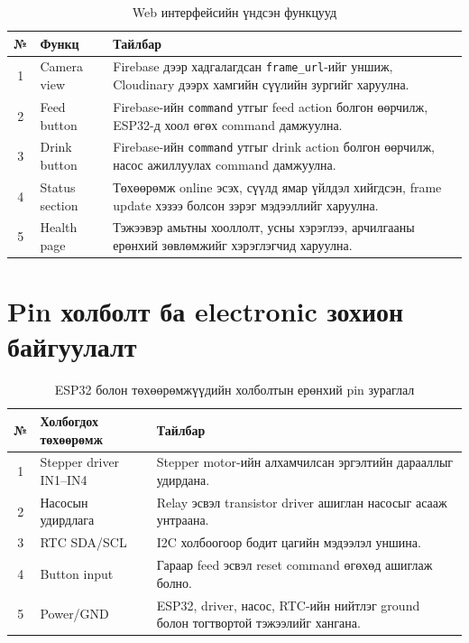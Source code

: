 \documentclass[12pt,a4paper]{report}
\begin{document}
\begin{table}[H]
\scriptsize
\centering
\caption{Web интерфейсийн үндсэн функцууд}
\begin{tabularx}{\textwidth}{|c|X|X|}
\hline
\textbf{№} & \textbf{Функц} & \textbf{Тайлбар} \\ \hline
1 & Camera view & Firebase дээр хадгалагдсан \texttt{frame\_url}-ийг уншиж, Cloudinary дээрх хамгийн сүүлийн зургийг харуулна. \\ \hline
2 & Feed button & Firebase-ийн \texttt{command} утгыг feed action болгон өөрчилж, ESP32-д хоол өгөх command дамжуулна. \\ \hline
3 & Drink button & Firebase-ийн \texttt{command} утгыг drink action болгон өөрчилж, насос ажиллуулах command дамжуулна. \\ \hline
4 & Status section & Төхөөрөмж online эсэх, сүүлд ямар үйлдэл хийгдсэн, frame update хэзээ болсон зэрэг мэдээллийг харуулна. \\ \hline
5 & Health page & Тэжээвэр амьтны хооллолт, усны хэрэглээ, арчилгааны ерөнхий зөвлөмжийг хэрэглэгчид харуулна. \\ \hline
\end{tabularx}
\end{table}

\section{Pin холболт ба electronic зохион байгуулалт}

\begin{table}[H]
\centering
\scriptsize
\caption{ESP32 болон төхөөрөмжүүдийн холболтын ерөнхий pin зураглал}
\begin{tabularx}{\textwidth}{|c|X|X|}
\hline
\textbf{№} & \textbf{Холбогдох төхөөрөмж} & \textbf{Тайлбар} \\ \hline
1 & Stepper driver IN1--IN4 & Stepper motor-ийн алхамчилсан эргэлтийн дарааллыг удирдана. \\ \hline
2 & Насосын удирдлага & Relay эсвэл transistor driver ашиглан насосыг асааж унтраана. \\ \hline
3 & RTC SDA/SCL & I2C холбоогоор бодит цагийн мэдээлэл уншина. \\ \hline
4 & Button input & Гараар feed эсвэл reset command өгөхөд ашиглаж болно. \\ \hline
5 & Power/GND & ESP32, driver, насос, RTC-ийн нийтлэг ground болон тогтвортой тэжээлийг хангана. \\ \hline
\end{tabularx}
\end{table}
\end{document}
